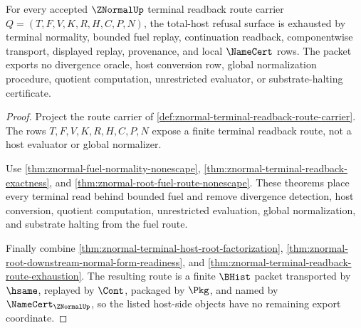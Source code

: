 \begin{theorem}
\label{thm:znormal-total-host-refusal-nonescape}
For every accepted $\ZNormalUp$ terminal readback route carrier $Q=(T,F,V,K,R,H,C,P,N)$, the total-host refusal surface is exhausted by terminal normality, bounded fuel replay, continuation readback, componentwise transport, displayed replay, provenance, and local $\NameCert$ rows. The packet exports no divergence oracle, host conversion row, global normalization procedure, quotient computation, unrestricted evaluator, or substrate-halting certificate.
\end{theorem}
\begin{proof}
Project the route carrier of \autoref{def:znormal-terminal-readback-route-carrier}. The rows $T,F,V,K,R,H,C,P,N$ expose a finite terminal readback route, not a host evaluator or global normalizer.

Use \autoref{thm:znormal-fuel-normality-nonescape}, \autoref{thm:znormal-terminal-readback-exactness}, and \autoref{thm:znormal-root-fuel-route-nonescape}. These theorems place every terminal read behind bounded fuel and remove divergence detection, host conversion, quotient computation, unrestricted evaluation, global normalization, and substrate halting from the fuel route.

Finally combine \autoref{thm:znormal-terminal-host-root-factorization}, \autoref{thm:znormal-root-downstream-normal-form-readiness}, and \autoref{thm:znormal-terminal-readback-route-exhaustion}. The resulting route is a finite $\BHist$ packet transported by $\hsame$, replayed by $\Cont$, packaged by $\Pkg$, and named by $\NameCert_{\ZNormalUp}$, so the listed host-side objects have no remaining export coordinate.
\end{proof}
